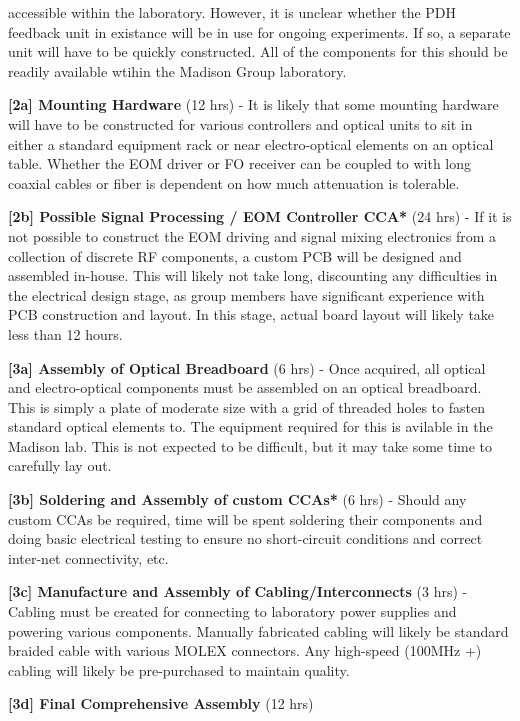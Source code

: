 \begin{packed_itemize}
  accessible within the laboratory. However, it is unclear whether the PDH
  feedback unit in existance will be in use for ongoing experiments. If so,
  a separate unit will have to be quickly constructed. All of the components
  for this should be readily available wtihin the Madison Group laboratory.
  \item{\textbf{[2a] Mounting Hardware}} (12 hrs)
  - It is likely that some mounting hardware will have to be constructed for
  various controllers and optical units to sit in either a standard equipment
  rack or near electro-optical elements on an optical table. Whether the EOM
  driver or FO receiver can be coupled to with long coaxial cables or fiber is
  dependent on how much attenuation is tolerable.
  \item{\textbf{[2b] Possible Signal Processing / EOM Controller CCA*} (24 hrs)}
  - If it is not possible to construct the EOM driving and signal mixing
  electronics from a collection of discrete RF components, a custom PCB will
  be designed and assembled in-house. This will likely not take long, discounting
  any difficulties in the electrical design stage, as group members have
  significant experience with PCB construction and layout. In this stage, actual
  board layout will likely take less than 12 hours.
  \item{\textbf{[3a] Assembly of Optical Breadboard} (6 hrs)}
  - Once acquired, all optical and electro-optical components must be assembled
  on an optical breadboard. This is simply a plate of moderate size with a
  grid of threaded holes to fasten standard optical elements to. The equipment
  required for this is avilable in the Madison lab. This is not expected to
  be difficult, but it may take some time to carefully lay out.
  \item{\textbf{[3b] Soldering and Assembly of custom CCAs*} (6 hrs)}
  - Should any custom CCAs be required, time will be spent soldering their
  components and doing basic electrical testing to ensure no short-circuit
  conditions and correct inter-net connectivity, etc.
  \item{\textbf{[3c] Manufacture and Assembly of Cabling/Interconnects} (3 hrs)}
  - Cabling must be created for connecting to laboratory power supplies
  and powering various components. Manually fabricated cabling will likely be
  standard braided cable with various MOLEX connectors. Any high-speed
  (100MHz +) cabling will likely be pre-purchased to maintain quality.
  \item{\textbf{[3d] Final Comprehensive Assembly} (12 hrs)}

\end{packed_itemize}
